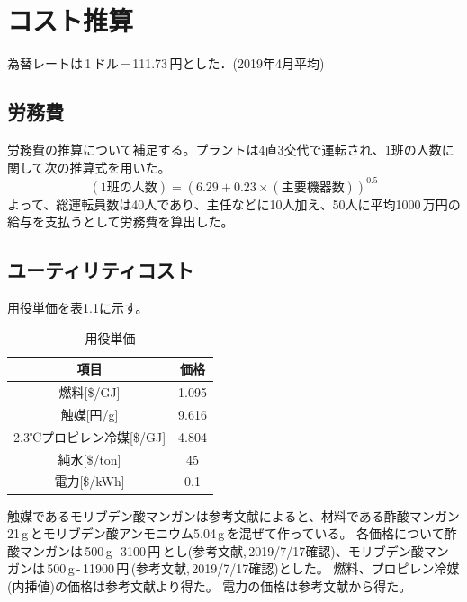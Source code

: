 \documentclass[a4j]{jsreport}
\begin{document}
\appendix
\chapter{コスト推算}
為替レートは\,1\,ドル\,=\,111.73\,円とした．(2019年4月平均)\par

\section{労務費}
労務費の推算について補足する。プラントは4直3交代で運転され、1班の人数に関して次の推算式を用いた。
\begin{equation}
    (1班の人数) = (6.29 + 0.23 \times (主要機器数))^{0.5}
\end{equation}
よって、総運転員数は40人であり、主任などに10人加え、50人に平均1000\,万円の給与を支払うとして労務費を算出した。

\section{ユーティリティコスト}
用役単価を表\ref{用役単価}に示す。
\begin{table}[htbp]
    \caption{用役単価}
    \label{用役単価}
    \begin{center}
        \begin{tabular}{cc}\hline
        項目                     & 価格                 \\\hline
        燃料[\$/GJ]          & 1.095                \\
        触媒[円/g]            & 9.616                \\
        2.3℃プロピレン冷媒[\$/GJ] & 4.804           \\
        純水[\$/ton]         & 45                  \\
        電力[\$/kWh]         & 0.1                 \\\hline
        \end{tabular}
    \end{center}
\end{table}
触媒であるモリブデン酸マンガンは参考文献\cite{Li2019}によると、材料である酢酸マンガン21\,g\,とモリブデン酸アンモニウム5.04\,g\,を混ぜて作っている。
各価格について酢酸マンガンは\,500\,g\,-\,3100\,円\,とし(参考文献\cite{酢酸マンガン},\,2019/7/17確認)、モリブデン酸マンガンは\,500\,g\,-\,11900\,円\,(参考文献\cite{モリブデン酸アンモニウム},\,2019/7/17確認)とした。
燃料、プロピレン冷媒(内挿値)の価格は参考文献\cite{プロセスデザインコンテスト10}より得た。
電力の価格は参考文献\cite{講義資料3}から得た。
\end{document}
